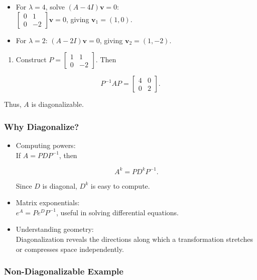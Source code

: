 \documentclass[
  12pt,
  a4paper,
]{article}
\begin{document}
\begin{itemize}
\item
  For \(\lambda = 4\), solve \((A-4I)\mathbf{v}=0\):\\
  \(\begin{bmatrix} 0 & 1 \\ 0 & -2 \end{bmatrix}\mathbf{v} = 0\),
  giving \(\mathbf{v}_1 = (1,0)\).
\item
  For \(\lambda = 2\): \((A-2I)\mathbf{v}=0\), giving
  \(\mathbf{v}_2 = (1,-2)\).
\end{itemize}

\begin{enumerate}
\def\labelenumi{\arabic{enumi}.}
\item
  Construct \(P = \begin{bmatrix} 1 & 1 \\ 0 & -2 \end{bmatrix}\). Then
\end{enumerate}

\[P^{-1} A P = \begin{bmatrix} 4 & 0 \\ 0 & 2 \end{bmatrix}.\]

Thus, \(A\) is diagonalizable.

\subsubsection{Why Diagonalize?}\label{why-diagonalize}

\begin{itemize}
\item
  Computing powers:\\
  If \(A = P D P^{-1}\), then

  \[A^k = P D^k P^{-1}.\]

  Since \(D\) is diagonal, \(D^k\) is easy to compute.
\item
  Matrix exponentials:\\
  \(e^A = P e^D P^{-1}\), useful in solving differential equations.
\item
  Understanding geometry:\\
  Diagonalization reveals the directions along which a transformation
  stretches or compresses space independently.
\end{itemize}

\subsubsection{Non-Diagonalizable
Example}\label{non-diagonalizable-example}
\end{document}
